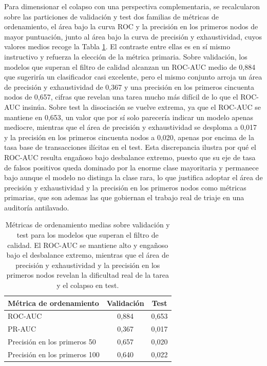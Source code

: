 Para dimensionar el colapso con una perspectiva complementaria, se recalcularon sobre las particiones de validación y test dos familias de métricas de ordenamiento, el área bajo la curva ROC y la precisión en los primeros nodos de mayor puntuación, junto al área bajo la curva de precisión y exhaustividad, cuyos valores medios recoge la Tabla \ref{tab:elliptic-rocauc}. El contraste entre ellas es en sí mismo instructivo y refuerza la elección de la métrica primaria. Sobre validación, los modelos que superan el filtro de calidad alcanzan un ROC-AUC medio de 0,884 que sugeriría un clasificador casi excelente, pero el mismo conjunto arroja un área de precisión y exhaustividad de 0,367 y una precisión en los primeros cincuenta nodos de 0,657, cifras que revelan una tarea mucho más difícil de lo que el ROC-AUC insinúa. Sobre test la disociación se vuelve extrema, ya que el ROC-AUC se mantiene en 0,653, un valor que por sí solo parecería indicar un modelo apenas mediocre, mientras que el área de precisión y exhaustividad se desploma a 0,017 y la precisión en los primeros cincuenta nodos a 0,020, apenas por encima de la tasa base de transacciones ilícitas en el test. Esta discrepancia ilustra por qué el ROC-AUC resulta engañoso bajo desbalance extremo, puesto que su eje de tasa de falsos positivos queda dominado por la enorme clase mayoritaria y permanece bajo aunque el modelo no distinga la clase rara, lo que justifica adoptar el área de precisión y exhaustividad y la precisión en los primeros nodos como métricas primarias, que son ademas las que gobiernan el trabajo real de triaje en una auditoría antilavado.

\begin{table}[htbp]
\centering
\renewcommand{\arraystretch}{1.3}
\begin{tabular}{lcc}
\toprule
\textbf{Métrica de ordenamiento} & \textbf{Validación} & \textbf{Test} \\
\midrule
ROC-AUC & 0,884 & 0,653 \\
PR-AUC & 0,367 & 0,017 \\
Precisión en los primeros 50 & 0,657 & 0,020 \\
Precisión en los primeros 100 & 0,640 & 0,022 \\
\bottomrule
\end{tabular}
\caption{Métricas de ordenamiento medias sobre validación y test para los modelos que superan el filtro de calidad. El ROC-AUC se mantiene alto y engañoso bajo el desbalance extremo, mientras que el área de precisión y exhaustividad y la precisión en los primeros nodos revelan la dificultad real de la tarea y el colapso en test.}
\label{tab:elliptic-rocauc}
\end{table}

